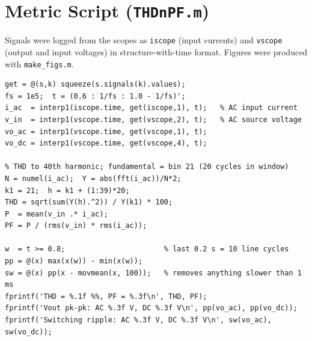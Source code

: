 \documentclass[11pt,a4paper]{article}
\begin{document}
\section{Metric Script (\texttt{THDnPF.m})}
Signals were logged from the scopes as \texttt{iscope} (input currents) and \texttt{vscope}
(output and input voltages) in structure-with-time format. Figures were produced with
\texttt{make\_figs.m}.
\begin{verbatim}
get = @(s,k) squeeze(s.signals(k).values);
fs = 1e5;  t = (0.6 : 1/fs : 1.0 - 1/fs)';
i_ac  = interp1(iscope.time, get(iscope,1), t);   % AC input current
v_in  = interp1(vscope.time, get(vscope,2), t);   % AC source voltage
vo_ac = interp1(vscope.time, get(vscope,1), t);
vo_dc = interp1(vscope.time, get(vscope,4), t);

% THD to 40th harmonic; fundamental = bin 21 (20 cycles in window)
N = numel(i_ac);  Y = abs(fft(i_ac))/N*2;
k1 = 21;  h = k1 + (1:39)*20;
THD = sqrt(sum(Y(h).^2)) / Y(k1) * 100;
P  = mean(v_in .* i_ac);
PF = P / (rms(v_in) * rms(i_ac));

w  = t >= 0.8;                       % last 0.2 s = 10 line cycles
pp = @(x) max(x(w)) - min(x(w));
sw = @(x) pp(x - movmean(x, 100));   % removes anything slower than 1 ms
fprintf('THD = %.1f %%, PF = %.3f\n', THD, PF);
fprintf('Vout pk-pk: AC %.3f V, DC %.3f V\n', pp(vo_ac), pp(vo_dc));
fprintf('Switching ripple: AC %.3f V, DC %.3f V\n', sw(vo_ac), sw(vo_dc));
\end{verbatim}
\end{document}
